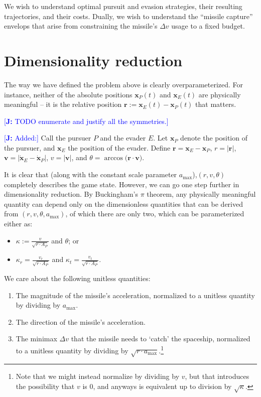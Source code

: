 \documentclass{article}
\newcommand{\authnote}[3]{\textcolor{#3}{[{\footnotesize {\bf #1:} { {#2}}}]}}
\newcommand{\jnote}[1]{\authnote{J}{#1}{blue} }
\renewcommand{\vec}[1]{\mathbf{#1}}
\begin{document}
We wish to understand optimal pursuit and evasion strategies, their resulting
trajectories, and their costs.  Dually, we wish to understand the ``missile
capture'' envelops that arise from constraining the missile's $\Delta v$ usage
to a fixed budget.

\section{Dimensionality reduction}
The way we have defined the problem above is clearly overparameterized.  For
instance, neither of the absolute positions $\vec{x}_P(t)$ and $\vec{x}_E(t)$
are physically meaningful -- it is the relative position $\vec{r} :=
\vec{x}_E(t) - \vec{x}_P(t)$ that matters.

\jnote{TODO enumerate and justify all the symmetries.}

\jnote{Added:}
\renewcommand{\vec}{\mathbf}
Call the pursuer $P$ and the evader $E$.  Let $\vec{x}_P$
  denote the position of the
  pursuer, and $\vec{x}_E$ the position of the evader.  Define $\vec{r} = \vec{x}_E
  - \vec{x}_P$, $r = | \vec{r} |$, $\vec{v} = \big | \dot{\vec{x}}_E -
  \dot{\vec{x}}_P \big |$, $v = | \vec{v} |$, and $\theta = \arccos \big ( \vec{r}
  \cdot \vec{v} \big )$.

  It is clear that (along with the constant scale parameter
  $a_{\max}$),$(r, v, \theta)$ completely describes the game state.  However, we
  can go one step further in dimensionality reduction.  By Buckingham's $\pi$
  theorem, any physically meaningful quantity can depend only on the
  dimensionless quantities that can be derived from $(r, v, \theta, a_{\max})$,
  of which there are only two, which can be parameterized either as:
  \begin{itemize}
  \item  $\kappa := \frac{v}{\sqrt{r \cdot A_P}}$
  and $\theta$; or
\item $\kappa_r = \frac{v_r}{\sqrt{r \cdot A_P}}$ and $\kappa_t =
  \frac{v_t}{\sqrt{r \cdot A_P}}$.
\end{itemize}


  We care about the following unitless quantities:
  \begin{enumerate}
  \item The magnitude of the missile's acceleration, normalized to a unitless
    quantity by dividing by $a_{\max}$.
  \item The direction of the missile's acceleration.
  \item The minimax $\Delta v$ that the missile needs to `catch' the spaceship,
    normalized to a unitless quantity by dividing by $\sqrt{r \cdot a_{\max}}$.\footnote{Note that we
      might instead normalize by dividing by $v$, but that introduces the
      possibility that $v$ is $0$, and anyways is equivalent up to division by $\sqrt{\kappa}$.}
  \end{enumerate}
\end{document}
